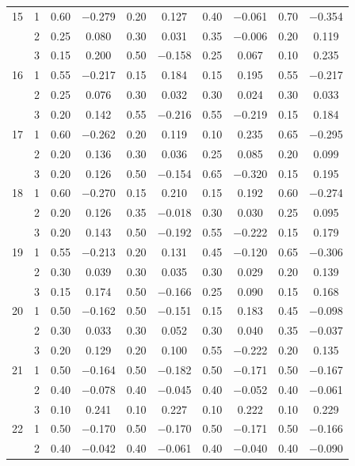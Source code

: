 \begin{longtable}{llcccccccc}
  15 & 1 & 0.60 & $-$0.279 & 0.20 & 0.127 & 0.40 & $-$0.061 & 0.70 & $-$0.354 \\ 
   & 2 & 0.25 & 0.080 & 0.30 & 0.031 & 0.35 & $-$0.006 & 0.20 & 0.119 \\ 
   & 3 & 0.15 & 0.200 & 0.50 & $-$0.158 & 0.25 & 0.067 & 0.10 & 0.235 \\ 
  16 & 1 & 0.55 & $-$0.217 & 0.15 & 0.184 & 0.15 & 0.195 & 0.55 & $-$0.217 \\ 
   & 2 & 0.25 & 0.076 & 0.30 & 0.032 & 0.30 & 0.024 & 0.30 & 0.033 \\ 
   & 3 & 0.20 & 0.142 & 0.55 & $-$0.216 & 0.55 & $-$0.219 & 0.15 & 0.184 \\ 
  17 & 1 & 0.60 & $-$0.262 & 0.20 & 0.119 & 0.10 & 0.235 & 0.65 & $-$0.295 \\ 
   & 2 & 0.20 & 0.136 & 0.30 & 0.036 & 0.25 & 0.085 & 0.20 & 0.099 \\ 
   & 3 & 0.20 & 0.126 & 0.50 & $-$0.154 & 0.65 & $-$0.320 & 0.15 & 0.195 \\ 
  18 & 1 & 0.60 & $-$0.270 & 0.15 & 0.210 & 0.15 & 0.192 & 0.60 & $-$0.274 \\ 
   & 2 & 0.20 & 0.126 & 0.35 & $-$0.018 & 0.30 & 0.030 & 0.25 & 0.095 \\ 
   & 3 & 0.20 & 0.143 & 0.50 & $-$0.192 & 0.55 & $-$0.222 & 0.15 & 0.179 \\ 
  19 & 1 & 0.55 & $-$0.213 & 0.20 & 0.131 & 0.45 & $-$0.120 & 0.65 & $-$0.306 \\ 
   & 2 & 0.30 & 0.039 & 0.30 & 0.035 & 0.30 & 0.029 & 0.20 & 0.139 \\ 
   & 3 & 0.15 & 0.174 & 0.50 & $-$0.166 & 0.25 & 0.090 & 0.15 & 0.168 \\ 
  20 & 1 & 0.50 & $-$0.162 & 0.50 & $-$0.151 & 0.15 & 0.183 & 0.45 & $-$0.098 \\ 
   & 2 & 0.30 & 0.033 & 0.30 & 0.052 & 0.30 & 0.040 & 0.35 & $-$0.037 \\ 
   & 3 & 0.20 & 0.129 & 0.20 & 0.100 & 0.55 & $-$0.222 & 0.20 & 0.135 \\ 
  21 & 1 & 0.50 & $-$0.164 & 0.50 & $-$0.182 & 0.50 & $-$0.171 & 0.50 & $-$0.167 \\ 
   & 2 & 0.40 & $-$0.078 & 0.40 & $-$0.045 & 0.40 & $-$0.052 & 0.40 & $-$0.061 \\ 
   & 3 & 0.10 & 0.241 & 0.10 & 0.227 & 0.10 & 0.222 & 0.10 & 0.229 \\ 
  22 & 1 & 0.50 & $-$0.170 & 0.50 & $-$0.170 & 0.50 & $-$0.171 & 0.50 & $-$0.166 \\ 
   & 2 & 0.40 & $-$0.042 & 0.40 & $-$0.061 & 0.40 & $-$0.040 & 0.40 & $-$0.090 \\ 

\end{longtable}
